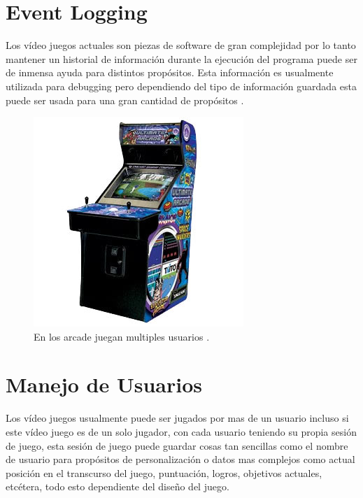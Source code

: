 \section{Event Logging}
Los vídeo juegos actuales son piezas de software de gran complejidad por lo tanto mantener un historial de información durante la ejecución del programa puede ser de inmensa ayuda para distintos propósitos. Esta información es usualmente utilizada para debugging pero dependiendo del tipo de información guardada esta puede ser usada para una gran cantidad de propósitos \cite{colm_tracing}.
\newpage
\setlength\intextsep{0pt}
\begin{figure}
\includegraphics[width=\linewidth]{media/arcade-machines.jpg}
\caption{En los arcade juegan multiples usuarios \cite{arcade_score}.}
\label{fig:arcade}
\end{figure}
\section{Manejo de Usuarios}
Los vídeo juegos usualmente puede ser jugados por mas de un usuario incluso si este vídeo juego es de un solo jugador, con cada usuario teniendo su propia sesión de juego, esta sesión de juego puede guardar cosas tan sencillas como el nombre de usuario para propósitos de personalización o datos mas complejos como actual posición en el transcurso del juego, puntuación, logros, objetivos actuales, etcétera, todo esto dependiente del diseño del juego.

